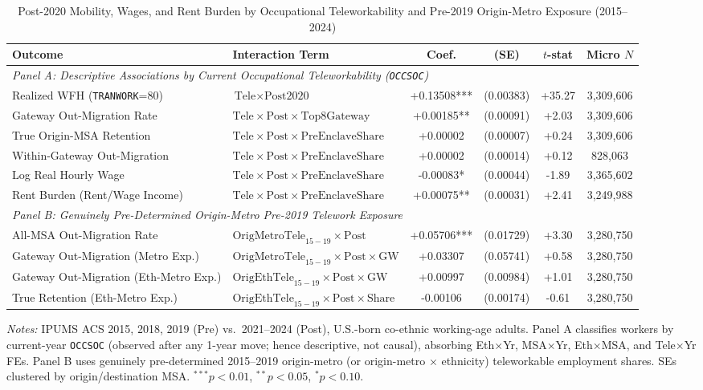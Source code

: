 \begin{table}[t!]
\centering
\caption{Post-2020 Mobility, Wages, and Rent Burden by Occupational Teleworkability and Pre-2019 Origin-Metro Exposure (2015--2024)}
\label{tab:telework_did}
\scriptsize
\setlength{\tabcolsep}{3pt}
\renewcommand{\arraystretch}{1.05}
\begin{tabular}{llcccc}
\toprule
Outcome & Interaction Term & Coef. & (SE) & $t$-stat & Micro $N$ \\
\midrule
\multicolumn{6}{l}{\textit{Panel A: Descriptive Associations by Current Occupational Teleworkability (\texttt{OCCSOC})}} \\
Realized WFH (\texttt{TRANWORK}=80) & $\text{Tele} \times \text{Post2020}$ & +0.13508*** & (0.00383) & +35.27 & 3,309,606 \\
Gateway Out-Migration Rate & $\text{Tele} \times \text{Post} \times \text{Top8Gateway}$ & +0.00185** & (0.00091) & +2.03 & 3,309,606 \\
True Origin-MSA Retention & $\text{Tele} \times \text{Post} \times \text{PreEnclaveShare}$ & +0.00002 & (0.00007) & +0.24 & 3,309,606 \\
Within-Gateway Out-Migration & $\text{Tele} \times \text{Post} \times \text{PreEnclaveShare}$ & +0.00002 & (0.00014) & +0.12 & 828,063 \\
Log Real Hourly Wage & $\text{Tele} \times \text{Post} \times \text{PreEnclaveShare}$ & -0.00083* & (0.00044) & -1.89 & 3,365,602 \\
Rent Burden (Rent/Wage Income) & $\text{Tele} \times \text{Post} \times \text{PreEnclaveShare}$ & +0.00075** & (0.00031) & +2.41 & 3,249,988 \\
\midrule
\multicolumn{6}{l}{\textit{Panel B: Genuinely Pre-Determined Origin-Metro Pre-2019 Telework Exposure}} \\
All-MSA Out-Migration Rate & $\text{OrigMetroTele}_{15-19} \times \text{Post}$ & +0.05706*** & (0.01729) & +3.30 & 3,280,750 \\
Gateway Out-Migration (Metro Exp.) & $\text{OrigMetroTele}_{15-19} \times \text{Post} \times \text{GW}$ & +0.03307 & (0.05741) & +0.58 & 3,280,750 \\
Gateway Out-Migration (Eth-Metro Exp.) & $\text{OrigEthTele}_{15-19} \times \text{Post} \times \text{GW}$ & +0.00997 & (0.00984) & +1.01 & 3,280,750 \\
True Retention (Eth-Metro Exp.) & $\text{OrigEthTele}_{15-19} \times \text{Post} \times \text{Share}$ & -0.00106 & (0.00174) & -0.61 & 3,280,750 \\
\bottomrule
\end{tabular}
\begin{minipage}{0.96\linewidth}
\footnotesize\textit{Notes:} IPUMS ACS 2015, 2018, 2019 (Pre) vs.\ 2021--2024 (Post), U.S.-born co-ethnic working-age adults. Panel A classifies workers by current-year \texttt{OCCSOC} (observed after any 1-year move; hence descriptive, not causal), absorbing Eth$\times$Yr, MSA$\times$Yr, Eth$\times$MSA, and Tele$\times$Yr FEs. Panel B uses genuinely pre-determined 2015--2019 origin-metro (or origin-metro $\times$ ethnicity) teleworkable employment shares. SEs clustered by origin/destination MSA. $^{***}p<0.01$, $^{**}p<0.05$, $^{*}p<0.10$.
\end{minipage}
\end{table}
